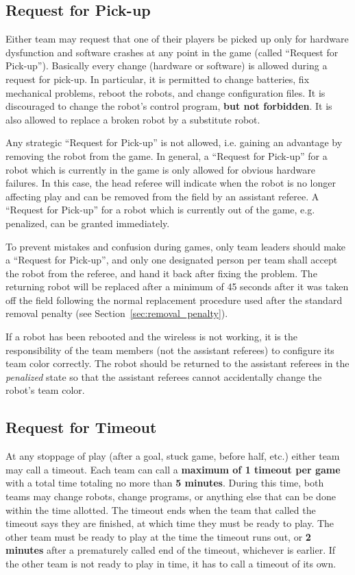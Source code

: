 \documentclass[12pt]{article}
\begin{document}
\subsection{Request for Pick-up}
\label{sec:request_for_pickup}

Either team may request that one of their players be picked up only for hardware dysfunction and software crashes at any point in the game (called ``Request for Pick-up''). 
Basically every change (hardware or software) is allowed during a request for pick-up. In particular,
it is permitted to change batteries, fix mechanical problems, reboot the robots, and change configuration files.
It is discouraged to change the robot's control program, \textbf{but not forbidden}.
It is also allowed to replace a broken robot by a substitute robot.

Any strategic ``Request for Pick-up'' is not allowed, i.e. gaining an advantage by removing the robot from the game.
In general, a ``Request for Pick-up'' for a robot which is currently in the game is only allowed for obvious hardware failures.
In this case, the head referee will indicate when the robot is no longer affecting play and can be removed from the field by an assistant referee.
A ``Request for Pick-up'' for a robot which is currently out of the game, e.g. penalized, can be granted immediately.

To prevent mistakes and confusion during games, only team leaders should make a ``Request for Pick-up'', and only one designated person per team shall accept the robot from the referee, and hand it back after fixing the problem.
The returning robot will be replaced after a minimum of 45 seconds after it was taken off the field following the normal replacement procedure used after the standard removal penalty (see Section~\ref{sec:removal_penalty}).

If a robot has been rebooted and the wireless is not working, it is the responsibility of the team members (not the assistant referees) to configure its team color correctly. The robot should be returned to the assistant referees in the \emph{penalized} state so that the assistant referees cannot accidentally change the robot's team color.

\subsection{Request for Timeout}
\label{sec:request_for_timeout}

At any stoppage of play (after a goal, stuck game, before half, etc.) either team may call a timeout. Each team can call a \textbf{maximum of 1 timeout per game} with a total time totaling no more than \textbf{5 minutes}. During this time, both teams may change robots, change programs, or anything else that can be done within the time allotted. 
The timeout ends when the team that called the timeout says they are finished, at which time they must be ready to play. The other team must be ready to play at the time the timeout runs out, or \textbf{2 minutes} after a prematurely called end of the timeout, whichever is earlier. If the other team is not ready to play in time, it has to call a timeout of its own.
  
\end{document}
